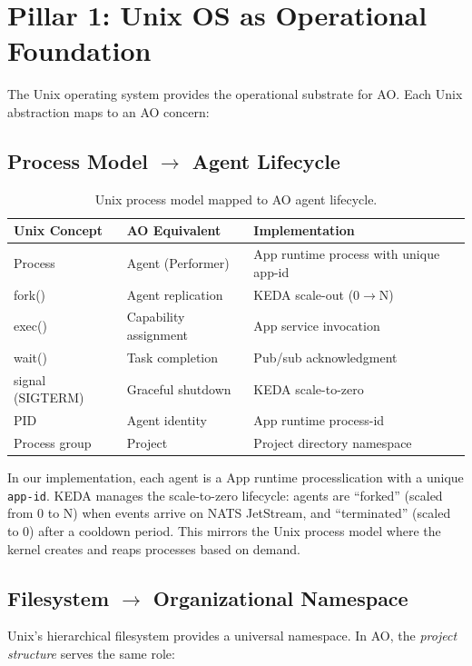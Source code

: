 \documentclass[11pt,a4paper]{article}
\begin{document}
\section{Pillar 1: Unix OS as Operational Foundation}

The Unix operating system provides the operational substrate for AO. Each Unix
abstraction maps to an AO concern:

\subsection{Process Model $\rightarrow$ Agent Lifecycle}

\begin{table}[h]
\centering
\begin{tabular}{@{}lll@{}}
\toprule
\textbf{Unix Concept} & \textbf{AO Equivalent} & \textbf{Implementation} \\
\midrule
Process & Agent (Performer) & App runtime process with unique app-id \\
fork() & Agent replication & KEDA scale-out (0$\rightarrow$N) \\
exec() & Capability assignment & App service invocation \\
wait() & Task completion & Pub/sub acknowledgment \\
signal (SIGTERM) & Graceful shutdown & KEDA scale-to-zero \\
PID & Agent identity & App runtime process-id \\
Process group & Project & Project directory namespace \\
\bottomrule
\end{tabular}
\caption{Unix process model mapped to AO agent lifecycle.}
\end{table}

In our implementation, each agent is a App runtime processlication with a unique
\texttt{app-id}. KEDA manages the scale-to-zero lifecycle: agents are
``forked'' (scaled from 0 to N) when events arrive on NATS JetStream, and
``terminated'' (scaled to 0) after a cooldown period. This mirrors the Unix
process model where the kernel creates and reaps processes based on demand.

\subsection{Filesystem $\rightarrow$ Organizational Namespace}

Unix's hierarchical filesystem provides a universal namespace. In AO, the
\emph{project structure} serves the same role:
\end{document}
